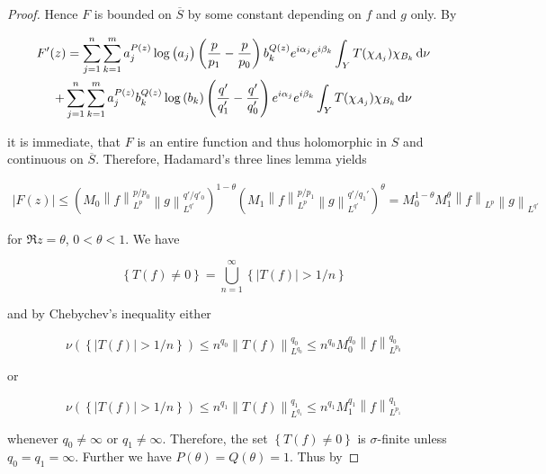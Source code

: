 \begin{proof}
Hence $F$ is bounded on $\overline{S}$ by some constant depending on $f$ and $g$ only. By 

\begin{multline*}
	F'(z) = \sum_{j = 1}^n\sum_{k = 1}^m a^{P(z)}_j\log \left( a_j \right) \left( \frac{p}{p_1} - \frac{p}{p_0} \right) b_k^{Q(z)}e^{i\alpha_j} e^{i\beta_k} \int_YT(\chi_{A_j})\chi_{B_k}\mathop{}\!\mathrm{d}\nu \\
	+  \sum_{j = 1}^n\sum_{k = 1}^m a^{P(z)}_jb_k^{Q(z)}\log\left( b_k \right)\left( \frac{q'}{q'_1} - \frac{q'}{q'_0} \right)e^{i\alpha_j} e^{i\beta_k} \int_YT(\chi_{A_j})\chi_{B_k}\mathop{}\!\mathrm{d}\nu 
\end{multline*}

\noindent it is immediate, that $F$ is an entire function and thus holomorphic in $S$ and continuous on $\overline{S}$. Therefore, Hadamard's three lines lemma yields

\begin{gather*}
	\left| F(z) \right| \leq \left( M_0  \left\|f\right\|_{L^p}^{p/p_0} \left\|g\right\|_{L^{q'}}^{q'/q'_0} \right)^{1 - \theta}\left(  M_1 \left\|f\right\|_{L^p}^{p/p_1}\left\|g\right\|_{L^{q'}}^{q'/q_1'} \right)^\theta = M_0^{1 - \theta}M_1^\theta \left\|f\right\|_{L^p}\left\|g\right\|_{L^{q'}}
\end{gather*}

\noindent for $\Re z = \theta$, $0 < \theta < 1$. We have

\begin{equation*}
	\left\{ T(f) \neq 0\right\} = \bigcup_{n = 1}^\infty \left\{ \left| T(f)\right| > 1/n\right\}
\end{equation*}

\noindent and by Chebychev's inequality either

\begin{equation*}
	\nu\left( \left\{ \left| T(f)\right| > 1/n\right\} \right) \leq n^{q_0}\left\| T(f)\right\|_{L^{q_0}}^{q_0} \leq n^{q_0}M_0^{q_0}\left\| f\right\|_{L^{p_0}}^{q_0}
\end{equation*}

\noindent or

\begin{equation*}
	\nu\left( \left\{ \left| T(f)\right| > 1/n\right\} \right) \leq n^{q_1}\left\| T(f)\right\|_{L^{q_1}}^{q_1} \leq  n^{q_1}M_1^{q_1}\left\| f\right\|_{L^{p_1}}^{q_1}
\end{equation*}

\noindent whenever $q_0 \neq \infty$ or $q_1 \neq \infty$. Therefore, the set $\left\{ T(f) \neq 0\right\}$ is $\sigma$-finite unless $q_0 = q_1 = \infty$. Further we have $P(\theta) = Q(\theta) = 1$. Thus by


\end{proof}
